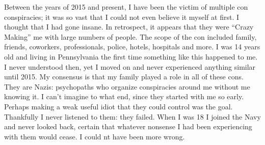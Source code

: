 ﻿\documentclass{article}
\date{\today}
\begin{document}
\maketitle

\begin{multicols}{2}


\begin{window}   
\end{window}

Between the years of 2015 and present, I have been the victim of multiple con conspiracies; it was so vast that I could not even believe it myself at first. I thought that I had gone insane. In retrospect, it appears that they were “Crazy Making” me with large numbers of people. The scope of the con included family, friends, coworkers, professionals, police, hotels, hospitals and more. I was 14 years old and living in Pennsylvania the first time something like this happened to me. I never understood then, yet I moved on and never experienced anything similar until 2015. My consensus is that my family played a role in all of these cons. They are Nazis: psychopaths who organize conspiracies around me without me knowing it. I can’t imagine to what end, since they started with me so early. Perhaps making a weak useful idiot that they could control was the goal. Thankfully I never listened to them: they failed. When I was 18 I joined the Navy and never looked back, certain that whatever nonsense I had been experiencing with them would cease. I could nt have been more wrong.

\end{multicols}


\closearticle
\end{document}
